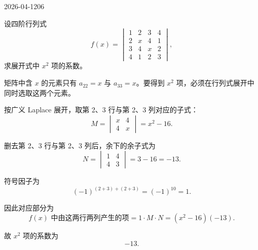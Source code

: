 \begin{mistake}{2026-04-12}{06}

\begin{problemcontent}
设四阶行列式
\[
f(x)=\begin{vmatrix}
1&2&3&4\\
2&x&4&1\\
3&4&x&2\\
4&1&2&3
\end{vmatrix},
\]
求展开式中 \(x^2\) 项的系数。

\end{problemcontent}

\begin{solutioncontent}
矩阵中含 \(x\) 的元素只有 \(a_{22}=x\) 与 \(a_{33}=x\)。要得到 \(x^2\) 项，必须在行列式展开中同时选取这两个元素。

按广义 Laplace 展开，取第 2、3 行与第 2、3 列对应的子式：
\[
M=\begin{vmatrix}
x&4\\
4&x
\end{vmatrix}=x^2-16.
\]

删去第 2、3 行与第 2、3 列后，余下的余子式为
\[
N=\begin{vmatrix}
1&4\\
4&3
\end{vmatrix}=3-16=-13.
\]

符号因子为
\[
(-1)^{(2+3)+(2+3)}=(-1)^{10}=1.
\]

因此对应部分为
\[
f(x)\text{ 中由这两行两列产生的项}=1\cdot M\cdot N=(x^2-16)(-13).
\]

故 \(x^2\) 项的系数为
\[
-13.
\]

\end{solutioncontent}


\end{mistake}
